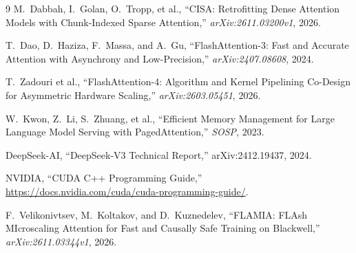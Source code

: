 \documentclass[10pt,twocolumn]{article}
\begin{document}
\begin{thebibliography}{9}
M.~Dabbah, I.~Golan, O.~Tropp, et al., ``CISA: Retrofitting Dense Attention Models with Chunk-Indexed Sparse Attention,'' \emph{arXiv:2611.03200v1}, 2026.

T.~Dao, D.~Haziza, F.~Massa, and A.~Gu, ``FlashAttention-3: Fast and Accurate Attention with Asynchrony and Low-Precision,'' \emph{arXiv:2407.08608}, 2024.

T.~Zadouri et al., ``FlashAttention-4: Algorithm and Kernel Pipelining Co-Design for Asymmetric Hardware Scaling,'' \emph{arXiv:2603.05451}, 2026.

W.~Kwon, Z.~Li, S.~Zhuang, et al., ``Efficient Memory Management for Large Language Model Serving with PagedAttention,'' \emph{SOSP}, 2023.

DeepSeek-AI, ``DeepSeek-V3 Technical Report,'' arXiv:2412.19437, 2024.

NVIDIA, ``CUDA C++ Programming Guide,'' \url{https://docs.nvidia.com/cuda/cuda-programming-guide/}.

F.~Velikonivtsev, M.~Koltakov, and D.~Kuznedelev, ``FLAMIA: FLAsh MIcroscaling Attention for Fast and Causally Safe Training on Blackwell,'' \emph{arXiv:2611.03344v1}, 2026.
\end{thebibliography}
\end{document}
